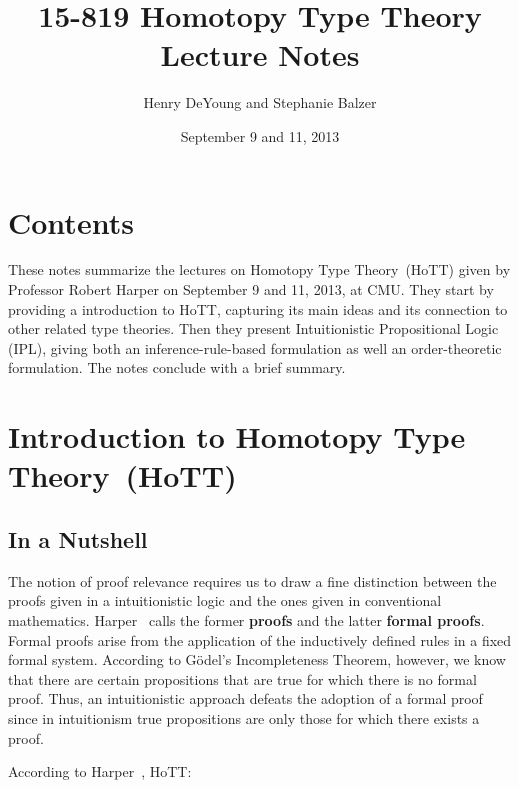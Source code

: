 \documentclass[12pt]{article}
\newcommand{\HoTT}{Homotopy Type Theory}
\begin{document}
\title{15-819 Homotopy Type Theory\\ Lecture Notes}
\author{Henry DeYoung and Stephanie Balzer}
\date{September 9 and 11, 2013}

\maketitle

\section{Contents}\label{sec:contents}

These notes summarize the lectures on \HoTT\ (HoTT) given by Professor Robert Harper on
September 9 and 11, 2013, at CMU.  They start by providing a introduction to HoTT, capturing
its main ideas and its connection to other related type theories.  Then they present
Intuitionistic Propositional Logic (IPL), giving both an inference-rule-based formulation as
well an order-theoretic formulation.  The notes conclude with a brief summary.


\section{Introduction to \HoTT\ (HoTT)}\label{sec:intro}

\subsection{In a Nutshell}\label{subsec:hott_in_nutshell}

The notion of proof relevance requires us to draw a fine distinction between the proofs given
in a intuitionistic logic and the ones given in conventional mathematics.
Harper~\cite{Harper2012} calls the former \textbf{proofs} and the latter \textbf{formal
  proofs}.  Formal proofs arise from the application of the inductively defined rules in a
fixed formal system.  According to G\"{o}del's Incompleteness Theorem, however, we know that
there are certain propositions that are true for which there is no formal proof.  Thus, an
intuitionistic approach defeats the adoption of a formal proof since in intuitionism true
propositions are only those for which there exists a proof.

According to Harper~\cite{Harper2013a,Harper2013}, HoTT:
\end{document}
